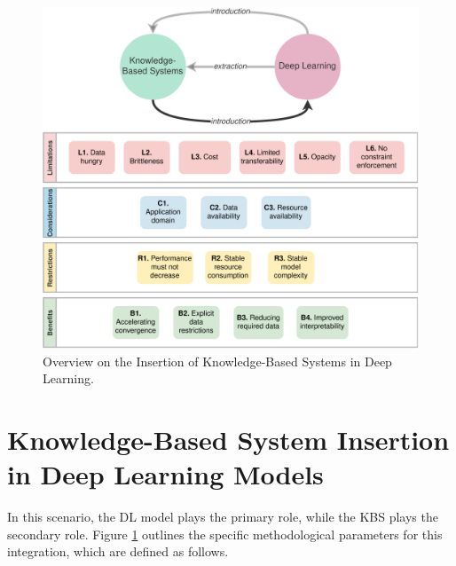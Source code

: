 \begin{figure}[ht]
    \centering
    \includegraphics[width=\linewidth]{4_kbsintegrationdl/figures/overview_kbs_dl_intro.eps}
    \caption{Overview on the Insertion of Knowledge-Based Systems in Deep Learning.}
    \label{fig:overview_kbs_dl_intro}
\end{figure}

\section{Knowledge-Based System Insertion in Deep Learning Models} \label{4_sec:methodology_kbs_intro_dl}

In this scenario, the DL model plays the primary role, while the KBS plays the secondary role. Figure \ref{fig:overview_kbs_dl_intro} outlines the specific methodological parameters for this integration, which are defined as follows.

